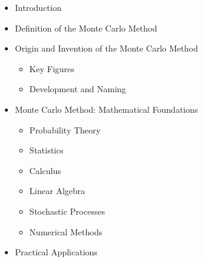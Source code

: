 \documentclass{article}
\begin{document}
\begin{itemize}
    \item Introduction
    \item Definition of the Monte Carlo Method
    \item Origin and Invention of the Monte Carlo Method
        \begin{itemize}
            \item Key Figures
            \item Development and Naming
        \end{itemize}
    \item Monte Carlo Method: Mathematical Foundations
        \begin{itemize}
            \item Probability Theory
            \item Statistics
            \item Calculus
            \item Linear Algebra
            \item Stochastic Processes
            \item Numerical Methods
        \end{itemize}
    \item Practical Applications
    

\end{itemize}
\end{document}
